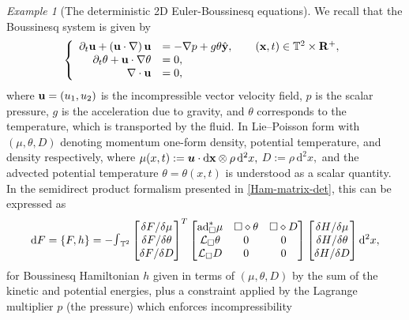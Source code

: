 \documentclass[11pt, oneside]{article}   	%
\numberwithin{equation}{section}
\theoremstyle{plain}
\theoremstyle{definition}
\theoremstyle{remark}
\newtheorem{example}{Example}
\newcommand{\<}{\langle}
\renewcommand{\>}{\rangle}
\def\diff{\textnormal{d}}
\def\RR{{\bf R}}
\def\u{{\bf{u}}}
\def\x{{\bf{x}}}
\def\y{{\bf{y}}}
\def\rmd{{\mathrm{d}}}
\newcommand{\mb}[1]{\mbox{\boldmath{$#1$}}}
\begin{document}
\begin{example}[The deterministic 2D Euler-Boussinesq equations] \label{EB-Ham-example2.1}
We recall that the Boussinesq system is given by
\begin{equation}\label{Inviscid_Boussinesq00}
\left\{
\begin{array}{rl}
\partial_t\u+\left(\u\cdot\nabla\right)\u &=-\nabla p + g\theta \hat{\y}, \qquad (\x,t)\in \mathbb{T}^2\times\RR^{+},\\
\partial_t\theta +\u\cdot\nabla \theta &= 0, \\
\nabla\cdot\u&=0,
\end{array}
\right.
\end{equation}
where $\u=(u_{1},u_{2})$ is the incompressible vector velocity field, $p$ is the scalar pressure, $g$ is the acceleration due to gravity, and $\theta$  corresponds to the temperature, which is transported by the fluid. In Lie--Poisson form with $(\mu,\theta,D)$ denoting momentum one-form density, potential temperature, and density respectively, where $\mu (x,t) :=  \mb u \cdot {\rmd} \x \otimes \rho \, {\rmd} ^2x,$ $D := \rho \, {\rmd} ^2x,$ and the advected potential temperature $\theta = \theta(x,t)$ is understood as a scalar quantity. In the semidirect product formalism presented in \eqref{Ham-matrix-det}, this can be expressed as
\begin{align}
\diff{F} =\{ F, h\}
=
-\hbox{\Large$\int$}_{\mathbb{T}^2}
\begin{bmatrix}
{\delta F}/{\delta \mu} \\  {\delta F}/{ \delta \theta}  \\  {\delta F}/{ \delta D}
\end{bmatrix}^T
\begin{bmatrix}
{\rm ad}^*_{\Box} \mu & \Box \diamond \theta & \Box \diamond D
\\ 
\mathcal{L}_{\Box} \theta & 0 & 0 \\
\mathcal{L}_{\Box} D & 0 & 0
\end{bmatrix}
\begin{bmatrix}
{\delta H } / {\delta \mu}
\\  {\delta H}/{ \delta \theta} \\
 {\delta H}/{ \delta D} 
\end{bmatrix}
{\rmd} ^2x,
\label{Ham-matrix-Boussinesq}
\end{align}
for Boussinesq Hamiltonian $h$ given in terms of $(\mu,\theta,D)$ by the sum of the kinetic and potential energies, plus a constraint applied by the Lagrange multiplier $p$ (the pressure) which enforces incompressibility

\end{example}
\end{document}
